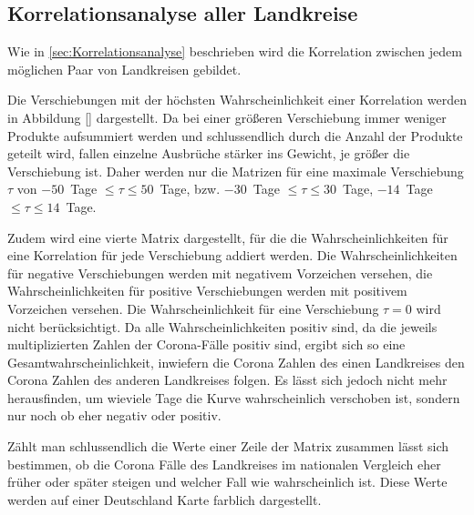 \subsection{Korrelationsanalyse aller Landkreise}
Wie in \autoref{sec:Korrelationsanalyse} beschrieben wird die Korrelation zwischen jedem möglichen Paar von Landkreisen gebildet. 

Die Verschiebungen mit der höchsten Wahrscheinlichkeit einer Korrelation werden in Abbildung \autoref{} dargestellt. Da bei einer größeren Verschiebung immer weniger Produkte aufsummiert werden und schlussendlich durch die Anzahl der Produkte geteilt wird, fallen einzelne Ausbrüche stärker ins Gewicht, je größer die Verschiebung ist. Daher werden nur die Matrizen für eine maximale Verschiebung $\tau$ von $-50$~Tage $\leq\tau\leq50$~Tage, bzw. $-30$~Tage $\leq\tau\leq30$~Tage, $-14$~Tage $\leq\tau\leq14$~Tage.

Zudem wird eine vierte Matrix dargestellt, für die die Wahrscheinlichkeiten für eine Korrelation für jede Verschiebung addiert werden. Die Wahrscheinlichkeiten für negative Verschiebungen werden mit negativem Vorzeichen versehen, die  Wahrscheinlichkeiten für positive Verschiebungen werden mit positivem Vorzeichen versehen. Die Wahrscheinlichkeit für eine Verschiebung $\tau=0$ wird nicht berücksichtigt. 
Da alle Wahrscheinlichkeiten positiv sind, da die jeweils multiplizierten Zahlen der Corona-Fälle positiv sind, ergibt sich so eine Gesamtwahrscheinlichkeit, inwiefern die Corona Zahlen des einen Landkreises den Corona Zahlen des anderen Landkreises folgen. Es lässt sich jedoch nicht mehr herausfinden, um wieviele Tage die Kurve wahrscheinlich verschoben ist, sondern nur noch ob eher negativ oder positiv.

Zählt man schlussendlich die Werte einer Zeile der Matrix zusammen lässt sich bestimmen, ob die Corona Fälle des Landkreises im nationalen Vergleich eher früher oder später steigen und welcher Fall wie wahrscheinlich ist. Diese Werte werden auf einer Deutschland Karte farblich dargestellt.

